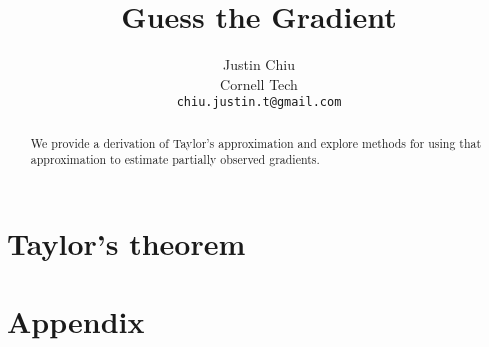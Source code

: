 \documentclass{article} %
\title{Guess the Gradient}
\author{
Justin Chiu \\ Cornell Tech \\ \texttt{chiu.justin.t@gmail.com}
}
\begin{document}
\maketitle

\begin{abstract}
We provide a derivation of Taylor's approximation and explore
methods for using that approximation to estimate partially observed gradients.
\end{abstract}

\section{Taylor's theorem}

\section{}




\appendix
\section{Appendix}
\end{document}
